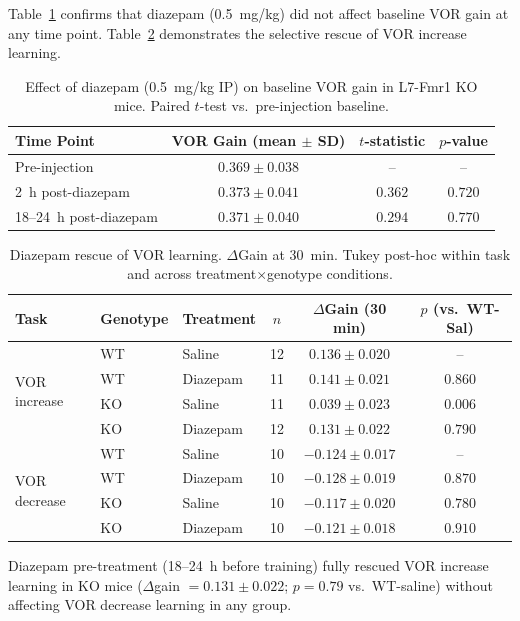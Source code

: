 \documentclass[11pt]{article}
\begin{document}
Table~\ref{tab:diazepam_baseline} confirms that diazepam (0.5~mg/kg) did not affect baseline VOR gain at any time point. Table~\ref{tab:diazepam_rescue} demonstrates the selective rescue of VOR increase learning.

\begin{table}[H]
\centering
\caption{Effect of diazepam (0.5~mg/kg IP) on baseline VOR gain in L7-Fmr1 KO mice. Paired $t$-test vs.\ pre-injection baseline.}
\label{tab:diazepam_baseline}
\begin{tabular}{lccc}
\toprule
Time Point & VOR Gain (mean $\pm$ SD) & $t$-statistic & $p$-value \\
\midrule
Pre-injection & $0.369 \pm 0.038$ & -- & -- \\
2~h post-diazepam & $0.373 \pm 0.041$ & $0.362$ & $0.720$ \\
18--24~h post-diazepam & $0.371 \pm 0.040$ & $0.294$ & $0.770$ \\
\bottomrule
\end{tabular}
\end{table}

\begin{table}[H]
\centering
\caption{Diazepam rescue of VOR learning. $\Delta$Gain at 30~min. Tukey post-hoc within task and across treatment$\times$genotype conditions.}
\label{tab:diazepam_rescue}
\begin{tabular}{lllccc}
\toprule
Task & Genotype & Treatment & $n$ & $\Delta$Gain (30 min) & $p$ (vs.\ WT-Sal) \\
\midrule
\multirow{4}{*}{VOR increase} & WT & Saline & 12 & $0.136 \pm 0.020$ & -- \\
 & WT & Diazepam & 11 & $0.141 \pm 0.021$ & $0.860$ \\
 & KO & Saline & 11 & $0.039 \pm 0.023$ & $0.006$ \\
 & KO & Diazepam & 12 & $\mathbf{0.131 \pm 0.022}$ & $0.790$ \\
\midrule
\multirow{4}{*}{VOR decrease} & WT & Saline & 10 & $-0.124 \pm 0.017$ & -- \\
 & WT & Diazepam & 10 & $-0.128 \pm 0.019$ & $0.870$ \\
 & KO & Saline & 10 & $-0.117 \pm 0.020$ & $0.780$ \\
 & KO & Diazepam & 10 & $-0.121 \pm 0.018$ & $0.910$ \\
\bottomrule
\end{tabular}
\end{table}

Diazepam pre-treatment (18--24~h before training) fully rescued VOR increase learning in KO mice ($\Delta$gain $= 0.131 \pm 0.022$; $p = 0.79$ vs.\ WT-saline) without affecting VOR decrease learning in any group.
\end{document}
